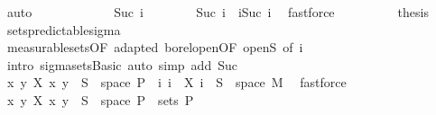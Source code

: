 \begin{isabellebody}
\ auto\isanewline
\ \ \ \ \isamarkupfalse%
\isanewline
\ \ \ \ \ \ \isamarkupfalse%
\ {\isacharparenleft}{\kern0pt}Suc\ i{\isacharparenright}{\kern0pt}\isanewline
\ \ \ \ \ \ \isamarkupfalse%
\ {\isachardoublequoteopen}{\isacharbraceleft}{\kern0pt}Suc\ i{\isacharbraceright}{\kern0pt}\ {\isacharequal}{\kern0pt}\ {\isacharbraceleft}{\kern0pt}i{\isacharless}{\kern0pt}{\isachardot}{\kern0pt}{\isachardot}{\kern0pt}Suc\ i{\isacharbraceright}{\kern0pt}{\isachardoublequoteclose}\ \isamarkupfalse%
\ fastforce\isanewline
\ \ \ \ \ \ \isamarkupfalse%
\ \isamarkupfalse%
\ {\isacharquery}{\kern0pt}thesis\ \isamarkupfalse%
\ sets{\isacharunderscore}{\kern0pt}predictable{\isacharunderscore}{\kern0pt}sigma\ \isanewline
\ \ \ \ \ \ \ \ \isamarkupfalse%
\ measurable{\isacharunderscore}{\kern0pt}sets{\isacharbrackleft}{\kern0pt}OF\ adapted\ borel{\isacharunderscore}{\kern0pt}open{\isacharbrackleft}{\kern0pt}OF\ open{\isacharunderscore}{\kern0pt}S{\isacharbrackright}{\kern0pt}{\isacharcomma}{\kern0pt}\ of\ i{\isacharbrackright}{\kern0pt}\ \isanewline
\ \ \ \ \ \ \ \ \isamarkupfalse%
\ {\isacharparenleft}{\kern0pt}intro\ sigma{\isacharunderscore}{\kern0pt}sets{\isachardot}{\kern0pt}Basic{\isacharcomma}{\kern0pt}\ auto\ simp\ add{\isacharcolon}{\kern0pt}\ Suc{\isacharparenright}{\kern0pt}\isanewline
\ \ \ \ \isamarkupfalse%
\isanewline
\ \ \ \ \isamarkupfalse%
\ \isamarkupfalse%
\ {\isachardoublequoteopen}{\isacharparenleft}{\kern0pt}{\isasymlambda}{\isacharparenleft}{\kern0pt}x{\isacharcomma}{\kern0pt}\ y{\isacharparenright}{\kern0pt}{\isachardot}{\kern0pt}\ X\ x\ y{\isacharparenright}{\kern0pt}\ {\isacharminus}{\kern0pt}{\isacharbackquote}{\kern0pt}\ S\ {\isasyminter}\ space\ {\isasymSigma}\isactrlsub P\ {\isacharequal}{\kern0pt}\ {\isacharparenleft}{\kern0pt}{\isasymUnion}i{\isachardot}{\kern0pt}\ {\isacharbraceleft}{\kern0pt}i{\isacharbraceright}{\kern0pt}\ {\isasymtimes}\ {\isacharparenleft}{\kern0pt}X\ i\ {\isacharminus}{\kern0pt}{\isacharbackquote}{\kern0pt}\ S\ {\isasyminter}\ space\ M{\isacharparenright}{\kern0pt}{\isacharparenright}{\kern0pt}{\isachardoublequoteclose}\ \isamarkupfalse%
\ fastforce\isanewline
\ \ \ \ \isamarkupfalse%
\ \isamarkupfalse%
\ {\isachardoublequoteopen}{\isacharparenleft}{\kern0pt}{\isasymlambda}{\isacharparenleft}{\kern0pt}x{\isacharcomma}{\kern0pt}\ y{\isacharparenright}{\kern0pt}{\isachardot}{\kern0pt}\ X\ x\ y{\isacharparenright}{\kern0pt}\ {\isacharminus}{\kern0pt}{\isacharbackquote}{\kern0pt}\ S\ {\isasyminter}\ space\ {\isasymSigma}\isactrlsub P\ {\isasymin}\ sets\ {\isasymSigma}\isactrlsub P{\isachardoublequoteclose}\ \isamarkupfalse%

\end{isabellebody}
